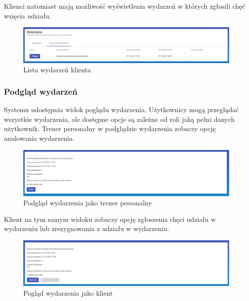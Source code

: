 \documentclass[a4paper,twoside,12pt]{book}
\begin{document}
Klienci natomiast mają możliwość wyświetlenia wydarzeń w których zgłosili chęć wzięcia udziału.
\begin{figure}[H]
	\centering
	\includegraphics[width=1\linewidth]{../zrzuty_ekranu/dzialanie/wydarzenia/klient_lista_wydarzen}
	\caption{Lista wydarzeń klienta}
	\label{fig:klientlistawydarzen}
\end{figure}

\subsubsection{Podgląd wydarzeń}
Systemu udostępnia widok poglądu wydarzenia. Użytkownicy mogą przeglądać wszystkie wydarzenia, ale dostępne opcje są zależne od roli jaką pełni danych użytkownik. Trener personalny w podglądzie wydarzenia zobaczy opcję anulowania wydarzenia.
\begin{figure}[H]
	\centering
	\includegraphics[width=1\linewidth]{../zrzuty_ekranu/dzialanie/wydarzenia/trener_podlad_wydarzenie}
	\caption{Podgląd wydarzenia jako trener personalny}
	\label{fig:trenerpodladwydarzenie}
\end{figure}

Klient na tym samym widoku zobaczy opcję zgłoszenia chęci udziału w wydarzeniu lub zrezygnowania z udziału w wydarzeniu.
\begin{figure}[H]
	\centering
	\includegraphics[width=1\linewidth]{../zrzuty_ekranu/dzialanie/wydarzenia/klient_podlad_wydarzenia}
	\caption{Pogląd wydarzenia jako klient}
	\label{fig:klientpodladwydarzenia}
\end{figure}
\end{document}
